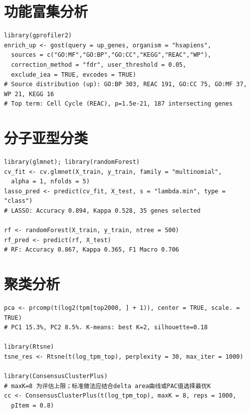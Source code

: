 \documentclass[12pt,a4paper,openany]{ctexbook}
\begin{document}
\section{功能富集分析}
\begin{lstlisting}[caption={g:Profiler功能富集}, basicstyle=\ttfamily\scriptsize]
library(gprofiler2)
enrich_up <- gost(query = up_genes, organism = "hsapiens",
  sources = c("GO:MF","GO:BP","GO:CC","KEGG","REAC","WP"),
  correction_method = "fdr", user_threshold = 0.05,
  exclude_iea = TRUE, evcodes = TRUE)
# Source distribution (up): GO:BP 303, REAC 191, GO:CC 75, GO:MF 37, WP 21, KEGG 16
# Top term: Cell Cycle (REAC), p=1.5e-21, 187 intersecting genes
\end{lstlisting}

\section{分子亚型分类}
\begin{lstlisting}[caption={LASSO与随机森林分类}, basicstyle=\ttfamily\scriptsize]
library(glmnet); library(randomForest)
cv_fit <- cv.glmnet(X_train, y_train, family = "multinomial",
  alpha = 1, nfolds = 5)
lasso_pred <- predict(cv_fit, X_test, s = "lambda.min", type = "class")
# LASSO: Accuracy 0.894, Kappa 0.528, 35 genes selected

rf <- randomForest(X_train, y_train, ntree = 500)
rf_pred <- predict(rf, X_test)
# RF: Accuracy 0.867, Kappa 0.365, F1 Macro 0.706
\end{lstlisting}

\section{聚类分析}
\begin{lstlisting}[caption={PCA/t-SNE/K-means/共识聚类}, basicstyle=\ttfamily\scriptsize]
pca <- prcomp(t(log2(tpm[top2000, ] + 1)), center = TRUE, scale. = TRUE)
# PC1 15.3%, PC2 8.5%. K-means: best K=2, silhouette=0.18

library(Rtsne)
tsne_res <- Rtsne(t(log_tpm_top), perplexity = 30, max_iter = 1000)

library(ConsensusClusterPlus)
# maxK=8 为评估上限；标准做法应结合delta area曲线或PAC值选择最优K
cc <- ConsensusClusterPlus(t(log_tpm_top), maxK = 8, reps = 1000,
  pItem = 0.8)
\end{lstlisting}
\end{document}
